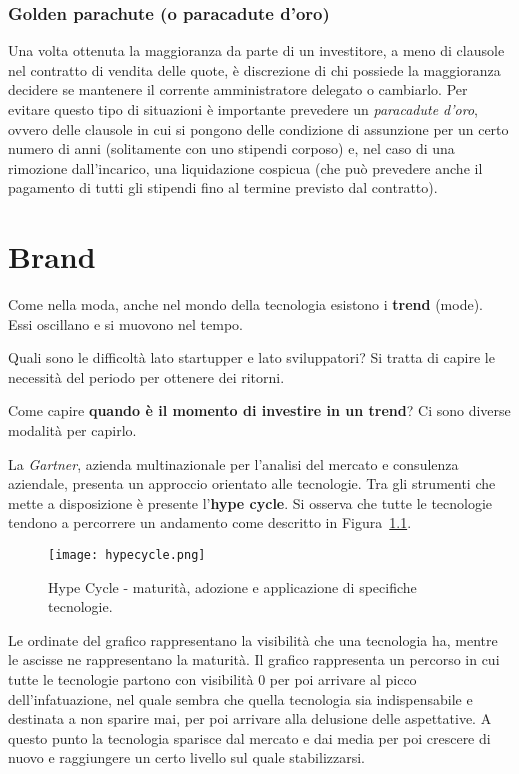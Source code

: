 \subsection{Golden parachute (o paracadute d'oro)}
Una volta ottenuta la maggioranza da parte di un investitore, a meno di
clausole nel contratto di vendita delle quote, è discrezione di chi possiede la
maggioranza decidere se mantenere il corrente amministratore delegato o
cambiarlo. Per evitare questo tipo di situazioni è importante prevedere un
\textit{paracadute d'oro}, ovvero delle clausole in cui si pongono delle
condizione di assunzione per un certo numero di anni (solitamente con uno
stipendi corposo) e, nel caso di una rimozione dall'incarico, una liquidazione
cospicua (che può prevedere anche il pagamento di tutti gli stipendi fino al
termine previsto dal contratto).

\chapter{Brand}

Come nella moda, anche nel mondo della tecnologia esistono i \textbf{trend}
(mode). Essi oscillano e si muovono nel tempo.

Quali sono le difficoltà lato startupper e lato sviluppatori? Si tratta di
capire le necessità del periodo per ottenere dei ritorni.

Come capire \textbf{quando è il momento di investire in un trend}?
Ci sono diverse modalità per capirlo.

La \textit{Gartner}, azienda multinazionale per l'analisi del mercato e
consulenza aziendale, presenta un approccio orientato alle tecnologie. Tra gli
strumenti che mette a disposizione è presente l'\textbf{hype cycle}.
Si osserva che tutte le tecnologie tendono a percorrere un andamento come
descritto in Figura~\ref{fig:hypecycle}.

\begin{figure}[H]
\centering
\texttt{[image: hypecycle.png]}
\caption[Grafico Hype Cycle]{Hype Cycle - maturità, adozione e applicazione di
specifiche tecnologie.}
\label{fig:hypecycle}
\end{figure}

Le ordinate del grafico rappresentano la visibilità che una tecnologia ha,
mentre le ascisse ne rappresentano la maturità.
Il grafico rappresenta un percorso in cui tutte le tecnologie partono con
visibilità 0 per poi arrivare al picco dell'infatuazione, nel quale sembra che
quella tecnologia sia indispensabile e destinata a non sparire mai,
per poi arrivare alla delusione delle aspettative.
A questo punto la tecnologia sparisce dal mercato e dai media per poi crescere
di nuovo e raggiungere un certo livello sul quale stabilizzarsi.

